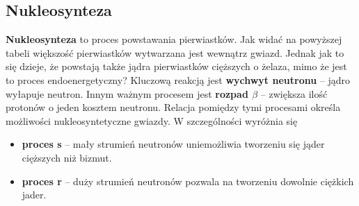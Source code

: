 \documentclass[../index.tex]{subfiles}
\begin{document}
        \subsection{Nukleosynteza}
            \textbf{Nukleosynteza} to proces powstawania pierwiastków. Jak widać na powyższej tabeli większość pierwiastków wytwarzana jest wewnątrz gwiazd. Jednak jak to się dzieje, że powstają także jądra pierwiastków cięższych o żelaza, mimo że jest to proces endoenergetyczny? Kluczową reakcją jest \textbf{wychwyt neutronu} – jądro wyłapuje neutron. Innym ważnym procesem jest \textbf{rozpad \(\beta\)} – zwiększa ilość protonów o jeden kosztem neutronu. Relacja pomiędzy tymi procesami określa możliwości nukleosyntetyczne gwiazdy. W szczególności wyróżnia się
            \begin{itemize}
                \item \textbf{proces s} – mały strumień neutronów uniemożliwia tworzeniu się jąder cięższych niż bizmut.
                \item \textbf{proces r} – duży strumień neutronów pozwala na tworzeniu dowolnie ciężkich jader.
            \end{itemize}
\end{document}
